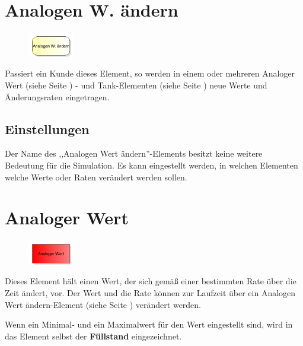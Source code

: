 \section{Analogen W. ändern}
\label{ref:ModelElementAnalogAssign}

\begin{figure}
\vspace{-22pt}
\includegraphics[width=2cm]{imageModelElementAnalogAssign.png}
\vspace{-22pt}
\end{figure}

Passiert ein Kunde dieses Element, so werden in einem oder mehreren
Analoger Wert (siehe Seite \pageref{ref:ModelElementAnalogValue}) - und
Tank-Elementen (siehe Seite \pageref{ref:ModelElementTank}) 
neue Werte und Änderungsraten eingetragen.

\subsection*{Einstellungen}

Der Name des ,,Analogen Wert ändern''-Elements besitzt keine weitere Bedeutung für die Simulation.
Es kann eingestellt werden, in welchen Elementen welche Werte oder Raten verändert werden sollen.


\section{Analoger Wert}
\label{ref:ModelElementAnalogValue}

\begin{figure}
\vspace{-22pt}
\includegraphics[width=2cm]{imageModelElementAnalogValue.png}
\vspace{-22pt}
\end{figure}

Dieses Element hält einen Wert, der sich gemäß einer bestimmten Rate über die Zeit ändert, vor.
Der Wert und die Rate können zur Laufzeit über ein
Analogen Wert ändern-Element (siehe Seite \pageref{ref:ModelElementAnalogAssign}) verändert werden.

Wenn ein Minimal- und ein Maximalwert für den Wert eingestellt sind, wird in das Element
selbst der \textbf{Füllstand} eingezeichnet.

